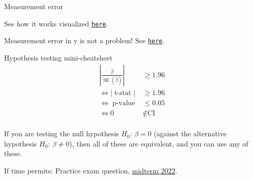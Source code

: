 \documentclass[11pt]{beamer}
\begin{document}
\begin{frame}{Measurement error}


See how it works visualized  \texttt{\alert{\href{https://jonathanold.github.io/images/measurement_error.gif}{here}}}.


Measurement error in y is not a problem! See  \texttt{\alert{\href{https://jonathanold.github.io/images/measurement_error_y.gif}{here}}}.



\end{frame}



\begin{frame}{Hypothesis testing mini-cheatsheet}
\vspace{-0.2cm}
\LARGE
\begin{align*}
    \left| \frac{\hat{\beta}}{\operatorname{SE}(\hat{\beta})} \right| &\geq 1.96 \\ 
    \Leftrightarrow | \operatorname{t-stat}| &\geq 1.96 \\  \Leftrightarrow \operatorname{p-value} &\leq 0.05 \\
    \Leftrightarrow 0 &\notin \text{CI}
\end{align*}
\\
\normalsize \alert{If you are testing the null hypothesis $H_0$: $\beta = 0$ (against the alternative hypothesis $H_0$: $\beta \neq 0$), then all of these are equivalent, and you can use any of these.}

\end{frame}





\begin{frame}
If time permits: Practice exam question, \href{https://drive.google.com/drive/folders/17FxycawzM1BVfxfxgbo2Mk0Ctkkp2PuG}{midterm 2022}.
\end{frame}
\end{document}
